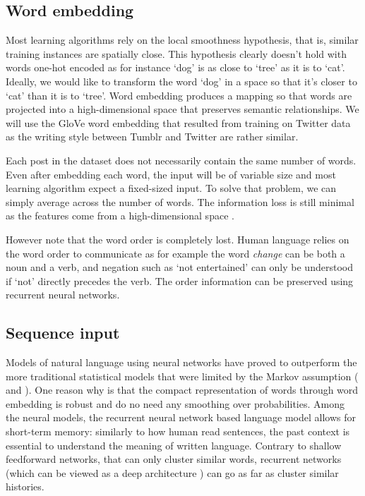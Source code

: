 \documentclass{article} %
\begin{document}
\subsection{Word embedding}
Most learning algorithms rely on the local smoothness hypothesis, that is, similar training instances are spatially close. This hypothesis clearly doesn't hold with words one-hot encoded as for instance `dog' is as close to `tree' as it is to `cat'. Ideally, we would like to transform the word `dog' in a space so that it's closer to `cat' than it is to `tree'. Word embedding produces a mapping so that words are projected into a high-dimensional space that preserves semantic relationships. We will use the GloVe word embedding that resulted from training on Twitter data as the writing style between Tumblr and Twitter are rather similar.

Each post in the dataset does not necessarily contain the same number of words. Even after embedding each word, the input will be of variable size and most learning algorithm expect a fixed-sized input. To solve that problem, we can simply average across the number of words. The information loss is still minimal as the features come from a high-dimensional space \citep{Flaxman-15}.

However note that the word order is completely lost. Human language relies on the word order to communicate as for example the word {\em change} can be both a noun and a verb, and negation such as `not entertained' can only be understood if `not' directly precedes the verb. The order information can be preserved using recurrent neural networks.

\subsection{Sequence input}
Models of natural language using neural networks have proved to outperform the more traditional statistical models that were limited by the Markov assumption (\citet{Bengio-03} and \citet{Goodman-01}). One reason why is that the compact representation of words through word embedding is robust \citep{Mikolov-11} and do no need any smoothing over probabilities. Among the neural models, the recurrent neural network based language model allows for short-term memory: similarly to how human read sentences, the past context is essential to understand the meaning of written language. Contrary to shallow feedforward networks, that can only cluster similar words, recurrent networks (which can be viewed as a deep architecture \citep{Bengio-07}) can go as far as cluster similar histories. 
\end{document}
